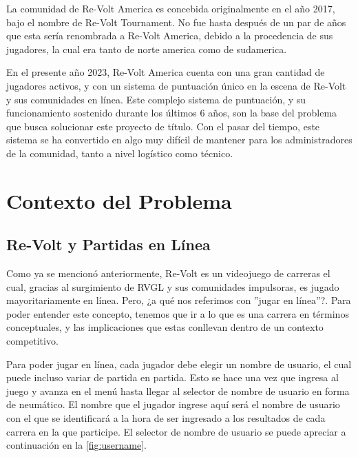 La comunidad de Re-Volt America es concebida originalmente en el año 2017, bajo el nombre de Re-Volt Tournament. No fue hasta después de un par de años que esta sería renombrada a Re-Volt America, debido a la procedencia de sus jugadores, la cual era tanto de norte america como de sudamerica.

En el presente año 2023, Re-Volt America cuenta con una gran cantidad de jugadores activos, y con un sistema de puntuación único en la escena de Re-Volt y sus comunidades en línea. Este complejo sistema de puntuación, y su funcionamiento sostenido durante los últimos 6 años, son la base del problema que busca solucionar este proyecto de título. Con el pasar del tiempo, este sistema se ha convertido en algo muy difícil de mantener para los administradores de la comunidad, tanto a nivel logístico como técnico.

\section{Contexto del Problema}

\subsection{Re-Volt y Partidas en Línea}
Como ya se mencionó anteriormente, Re-Volt es un videojuego de carreras el cual, gracias al surgimiento de RVGL y sus comunidades impulsoras, es jugado mayoritariamente en línea. Pero, ¿a qué nos referimos con ''jugar en línea''?. Para poder entender este concepto, tenemos que ir a lo que es una carrera en términos conceptuales, y las implicaciones que estas conllevan dentro de un contexto competitivo.

Para poder jugar en línea, cada jugador debe elegir un nombre de usuario, el cual puede incluso variar de partida en partida. Esto se hace una vez que ingresa al juego y avanza en el menú hasta llegar al selector de nombre de usuario en forma de neumático. El nombre que el jugador ingrese aquí será el nombre de usuario con el que se identificará a la hora de ser ingresado a los resultados de cada carrera en la que participe. El selector de nombre de usuario se puede apreciar a continuación en la \autoref{fig:username}.


